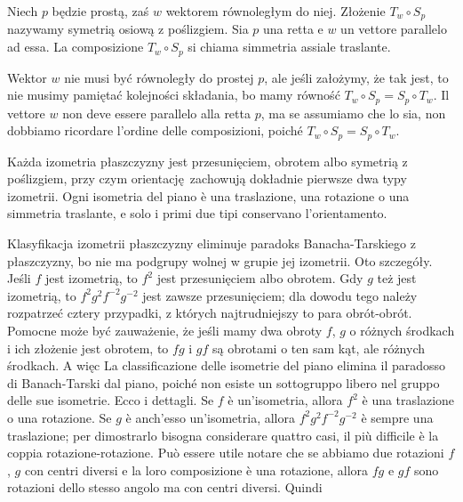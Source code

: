 \begin{definition}
    Niech $p$ będzie prostą, zaś $w$ wektorem równoległym do niej. %
    Złożenie $T_w \circ S_p$ nazywamy symetrią osiową z poślizgiem. %
    Sia $p$ una retta e $w$ un vettore parallelo ad essa. %
    La composizione $T_w \circ S_p$ si chiama simmetria assiale traslante. %
\end{definition}

Wektor $w$ nie musi być równoległy do prostej $p$, ale jeśli założymy, że tak jest, to nie musimy pamiętać kolejności składania, bo mamy równość $T_w \circ S_p = S_p \circ T_w$. %
Il vettore $w$ non deve essere parallelo alla retta $p$, ma se assumiamo che lo sia, non dobbiamo ricordare l'ordine delle composizioni, poiché $T_w \circ S_p = S_p \circ T_w$. %

\begin{corollary}
    Każda izometria płaszczyzny jest przesunięciem, obrotem albo symetrią z poślizgiem, przy czym orientację zachowują dokładnie pierwsze dwa typy izometrii. %
    Ogni isometria del piano è una traslazione, una rotazione o una simmetria traslante, e solo i primi due tipi conservano l'orientamento. %
\end{corollary}

Klasyfikacja izometrii płaszczyzny eliminuje paradoks Banacha-Tarskiego z płaszczyzny, bo nie ma podgrupy wolnej w grupie jej izometrii. %
Oto szczegóły. %
Jeśli $f$ jest izometrią, to $f^2$ jest przesunięciem albo obrotem. %
Gdy $g$ też jest izometrią, to $f^2g^2f^{-2}g^{-2}$ jest zawsze przesunięciem; dla dowodu tego należy rozpatrzeć cztery przypadki, z których najtrudniejszy to para obrót-obrót. %
Pomocne może być zauważenie, że jeśli mamy dwa obroty $f$, $g$ o różnych środkach i ich złożenie jest obrotem, to $fg$ i $gf$ są obrotami o ten sam kąt, ale różnych środkach. %
A więc %
La classificazione delle isometrie del piano elimina il paradosso di Banach-Tarski dal piano, poiché non esiste un sottogruppo libero nel gruppo delle sue isometrie. %
Ecco i dettagli. %
Se $f$ è un'isometria, allora $f^2$ è una traslazione o una rotazione. %
Se $g$ è anch'esso un'isometria, allora $f^2 g^2 f^{-2} g^{-2}$ è sempre una traslazione; per dimostrarlo bisogna considerare quattro casi, il più difficile è la coppia rotazione-rotazione. %
Può essere utile notare che se abbiamo due rotazioni $f$, $g$ con centri diversi e la loro composizione è una rotazione, allora $fg$ e $gf$ sono rotazioni dello stesso angolo ma con centri diversi. %
Quindi %

